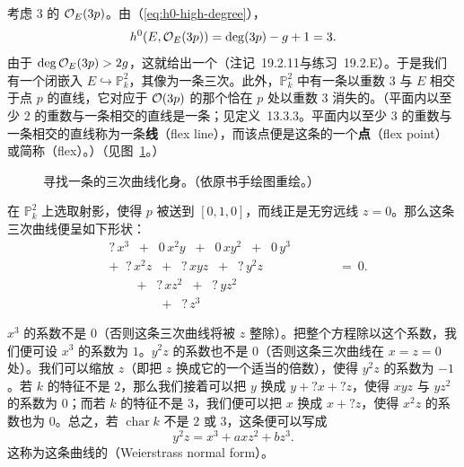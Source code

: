考虑\trDegree{} $3$ 的\trInvertibleSheaf{} $\mathcal{O}_E(3p)$。由\trRiemannRoch{}（\eqref{eq:h0-high-degree}），
\[
h^0(E,\mathcal{O}_E(3p))=\deg(3p)-g+1=3.
\]
由于 $\deg\mathcal{O}_E(3p)>2g$，这就给出一个\trClosedEmbedding（\mbox{注记~19.2.11}与\mbox{练习~19.2.E}）。于是我们有一个闭嵌入 $E\hookrightarrow\mathbb{P}^2_k$，其像为一条三次\trCurve。此外，$\mathbb{P}^2_k$ 中有一条以重数 $3$ 与 $E$ 相交于点 $p$ 的直线，它对应于 $\mathcal{O}(3p)$ 的那个恰在 $p$ 处以重数 $3$ 消失的\trSection。（平面内以至少 $2$ 的重数与一条\trSmooth\trCurve{}相交的直线是一条\trTangentLine；见\mbox{定义~13.3.3}。平面内以至少 $3$ 的重数与一条\trSmooth\trCurve{}相交的直线称为一条\textbf{\trFlex{}线}（flex line），而该点便是这条\trCurve{}的一个\textbf{\trFlex{}点}（flex point）或简称\textbf{\trFlex}（flex）。）（见图~\ref{fig:weierstrass-cubic}。）

\begin{figure}[htbp]
\centering
{}
\caption{寻找一条\trEllipticCurve{}的三次曲线化身。（依原书手绘图重绘。）}\label{fig:weierstrass-cubic}
\end{figure}

在 $\mathbb{P}^2_k$ 上选取射影\trCoordinate，使得 $p$ 被送到 $[0,1,0]$，而\trFlex{}线正是无穷远线 $z=0$。那么这条三次曲线便呈如下形状：
\[
\begin{aligned}
&?\,x^3\;\;+\;\;0\,x^2y\;\;+\;\;0\,xy^2\;\;+\;\;0\,y^3\\
&+\;\;?\,x^2z\;\;+\;\;?\,xyz\;\;+\;\;?\,y^2z\qquad\qquad\qquad=\ 0.\\
&\qquad+\;\;?\,xz^2\;\;+\;\;?\,yz^2\\
&\qquad\qquad+\;\;?\,z^3
\end{aligned}
\]

$x^3$ 的系数不是 $0$（否则这条三次曲线将被 $z$ 整除）。把整个方程除以这个系数，我们便可设 $x^3$ 的系数为 $1$。$y^2z$ 的系数也不是 $0$（否则这条三次曲线在 $x=z=0$ 处\trSingular）。我们可以缩放 $z$（即把 $z$ 换成它的一个适当的倍数），使得 $y^2z$ 的系数为 $-1$。若 $k$ 的特征不是 $2$，那么我们接着可以把 $y$ 换成 $y+?x+?z$，使得 $xyz$ 与 $yz^2$ 的系数为 $0$；而若 $k$ 的特征不是 $3$，我们便可以把 $x$ 换成 $x+?z$，使得 $x^2z$ 的系数也为 $0$。总之，若 $\operatorname{char}k$ 不是 $2$ 或 $3$，这条\trEllipticCurve{}便可以写成
\begin{equation*}\tag{19.9.8.1}\label{eq:weierstrass-normal-form}
y^2z=x^3+axz^2+bz^3.
\end{equation*}
这称为这条曲线的\textbf{\trWeierstrassNormalForm}（Weierstrass normal form）。


